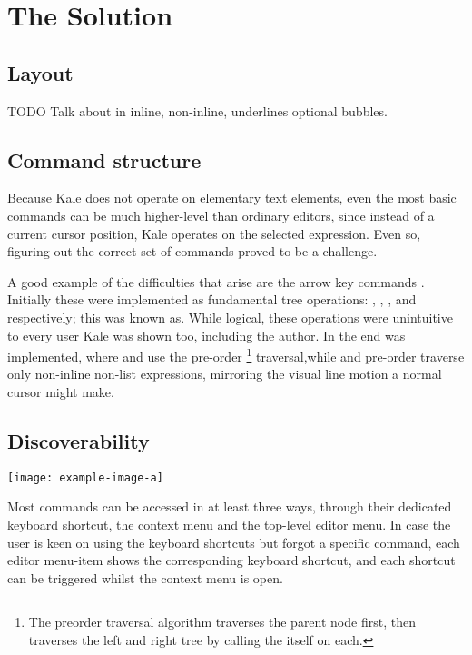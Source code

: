 \documentclass[11pt]{report}
\begin{document}
\chapter{The Solution}

\section{Layout}

TODO Talk about in inline, non-inline, underlines optional bubbles.

\section{Command structure}
Because Kale does not operate on elementary text elements, even the most basic
commands can be much higher-level than ordinary editors, since instead of a
current cursor position, Kale operates on the selected expression. Even so,
figuring out the correct set of commands proved to be a challenge.

\newcommand{\aup}{\keys{\arrowkeyup}}
\newcommand{\adown}{\keys{\arrowkeydown}}
\newcommand{\aleft}{\keys{\arrowkeyleft}}
\newcommand{\aright}{\keys{\arrowkeyright}}
A good example of the difficulties that arise are the arrow key commands
\aup{} \adown{} \aleft{} \aright{}. Initially these were implemented as
fundamental tree operations: , ,
, and  respectively; this
was known as. While logical, these operations were unintuitive to every user
Kale was shown too, including the author. In the end  was
implemented, where \aleft{} and \aright{} use the pre-order
%
\footnote{The preorder traversal algorithm traverses the parent node first,
then traverses the left and right tree by calling the itself on each.}
%
traversal,while \aup{} and \adown{}
pre-order traverse only non-inline non-list expressions, mirroring the visual
line motion a normal cursor might make.

\section{Discoverability}

\texttt{[image: example-image-a]}

Most commands can be accessed in at least three ways, through their dedicated
keyboard shortcut, the context menu and the top-level editor menu. In case the
user is keen on using the keyboard shortcuts but forgot a specific command,
each editor menu-item shows the corresponding keyboard shortcut, and each
shortcut can be triggered whilst the context menu is open.
\end{document}
